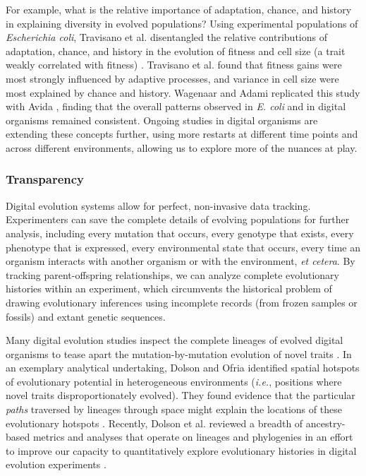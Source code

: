 For example, what is the relative importance of adaptation, chance, and history in explaining diversity in evolved populations? 
Using experimental populations of \textit{Escherichia coli}, Travisano et al. disentangled the relative contributions of adaptation, chance, and history in the evolution of fitness and cell size (a trait weakly correlated with fitness) \citep{travisano_experimental_1995}.
Travisano et al. found that fitness gains were most strongly influenced by adaptive processes, and variance in cell size were most explained by chance and history. 
Wagenaar and Adami replicated this study with Avida \citep{wagenaar_influence_2004}, finding that the overall patterns observed in \textit{E. coli} and in digital organisms remained consistent.
Ongoing studies in digital organisms are extending these concepts further, using more restarts at different time points and across different environments, allowing us to explore more of the nuances at play.

\subsubsection{Transparency}

Digital evolution systems allow for perfect, non-invasive data tracking.
Experimenters can save the complete details of evolving populations for further analysis, including every mutation that occurs, every genotype that exists, every phenotype that is expressed, every environmental state that occurs, every time an organism interacts with another organism or with the environment, \textit{et cetera}.
By tracking parent-offspring relationships, we can analyze complete evolutionary histories within an experiment, which circumvents the historical problem of drawing evolutionary inferences using incomplete records (from frozen samples or fossils) and extant genetic sequences.

Many digital evolution studies inspect the complete lineages of evolved digital organisms to tease apart the mutation-by-mutation evolution of novel traits \citep{lenski_evolutionary_2003,dolson_spatial_2017,grabowski_case_2013,goldsby_evolutionary_2014,pontes_evolutionary_2020}.
In an exemplary analytical undertaking, Dolson and Ofria identified spatial hotspots of evolutionary potential in heterogeneous environments (\textit{i.e.}, positions where novel traits disproportionately evolved).
They found evidence that the particular \textit{paths} traversed by lineages through space might explain the locations of these evolutionary hotspots \citep{dolson_hotspots_2017}. 
Recently, Dolson et al. reviewed a breadth of ancestry-based metrics and analyses that operate on lineages and phylogenies in an effort to improve our capacity to quantitatively explore evolutionary histories in digital evolution experiments \citep{dolson_interpreting_2020}.

